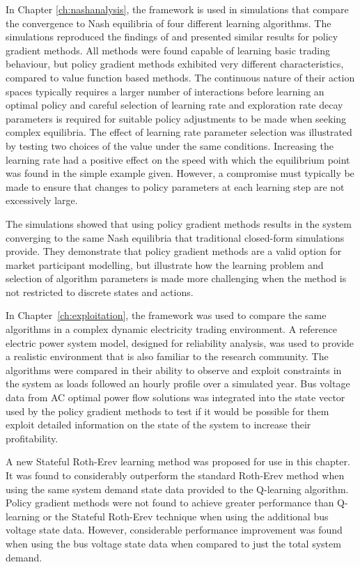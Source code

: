 In Chapter \ref{ch:nashanalysis}, the framework is used in simulations that
compare the convergence to Nash equilibria of four different learning
algorithms.  The simulations reproduced the findings of 
and presented similar results for policy gradient methods.  All methods were
found capable of learning basic trading behaviour, but policy gradient methods
exhibited very different characteristics, compared to value function based
methods. The continuous nature of their action spaces typically requires a
larger number of interactions before learning an optimal policy and careful
selection of learning rate and exploration rate decay parameters is required for
suitable policy adjustments to be made when seeking complex equilibria. The
effect of learning rate parameter selection was illustrated by testing two
choices of the value under the same conditions. Increasing the learning rate had
a positive effect on the speed with which the equilibrium point was found in the
simple example given.  However, a compromise must typically be made to ensure
that changes to policy parameters at each learning step are not excessively
large.

The simulations showed that using policy gradient methods results in the system
converging to the same Nash equilibria that traditional closed-form simulations
provide.  They demonstrate that policy gradient methods are a valid option for
market participant modelling, but illustrate how the learning problem and
selection of algorithm parameters is made more challenging when the method is
not restricted to discrete states and actions.

In Chapter~\ref{ch:exploitation}, the framework was used to compare the same
algorithms in a complex dynamic electricity trading environment.  A reference
electric power system model, designed for reliability analysis, was used to
provide a realistic environment that is also familiar to the research community.
The algorithms were compared in their ability to observe and exploit constraints
in the system as loads followed an hourly profile over a simulated year.  Bus
voltage data from AC optimal power flow solutions was integrated into the state
vector used by the policy gradient methods to test if it would be possible for
them exploit detailed information on the state of the system to increase their
profitability.

A new Stateful Roth-Erev learning method was proposed for use in this chapter.
It was found to considerably outperform the standard Roth-Erev method when using
the same system demand state data provided to the Q-learning algorithm. Policy
gradient methods were not found to achieve greater performance than Q-learning
or the Stateful Roth-Erev technique when using the additional bus voltage state
data.  However, considerable performance improvement was found when using the
bus voltage state data when compared to just the total system demand.

